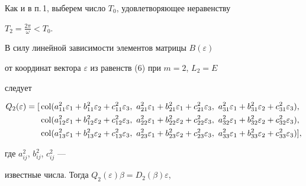 Как и в п.\,1, выберем число $T_0$, удовлетворяющее неравенству 


$T_2=\frac{2\pi}{\omega}<T_0$. 


В силу линейной зависимости элементов матрицы $B(\varepsilon)$ 


от координат вектора $\varepsilon$ из равенств (6) при $m=2$, $L_2=E$ 


следует 


\begin{align*} 


Q_2(\varepsilon)=[&\col(a^2_{11}\varepsilon_1+b^2_{11}\varepsilon_2+ 


c^2_{11}\varepsilon_3,\ a^2_{21}\varepsilon_1+ 


b^2_{21}\varepsilon_1+c^2_{21}\varepsilon_3,\ 


a^2_{31}\varepsilon_1+b^2_{31}\varepsilon_2+ 


c^2_{31}\varepsilon_3),\\ 


&\col(a^2_{12}\varepsilon_1+b^2_{12}\varepsilon_2+ 


c^2_{12}\varepsilon_3,\ a^2_{22}\varepsilon_1+ 


b^2_{22}\varepsilon_2+c^2_{22}\varepsilon_3,\ 


a^2_{32}\varepsilon_1+b^2_{32}\varepsilon_2+ 


c^2_{32}\varepsilon_3),\\ 


&\col(a^2_{13}\varepsilon_1+b^2_{13}\varepsilon_2+ 


c^2_{13}\varepsilon_3,\ a^2_{23}\varepsilon_1+ 


b^2_{23}\varepsilon_2+c^2_{23}\varepsilon_3,\ 


a^2_{33}\varepsilon_1+b^2_{33}\varepsilon_2+ 


c^2_{33}\varepsilon_3)],


\end{align*} 


где $a^2_{ij}$, $b^2_{ij}$, $c^2_{ij}$ --- 


известные числа. Тогда $Q_2(\varepsilon)\beta=D_2(\beta)\varepsilon$, 


